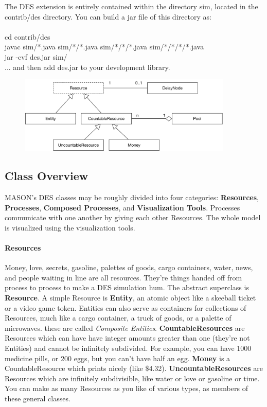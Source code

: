 \documentclass[twoside,10pt]{article}
\newcommand\file[1]{\textsf{#1}}
\newcommand\code[1]{\textsf{#1}}
\begin{document}
The DES extension is entirely contained within the directory \file{sim}, located in the \file{contrib/des} directory.  You can build a jar file of this directory as:
\\
\\
\code{cd contrib/des}\\
\code{javac sim/*.java sim/*/*.java sim/*/*/*.java sim/*/*/*/*.java}\\
\code{jar -cvf des.jar sim/}
\\

... and then add \code{des.jar} to your development library.

\begin{figure}[t]
\centering\includegraphics[width=4in]{Resources.pdf}
\end{figure}

\subsection{Class Overview}

MASON's DES classes may be roughly divided into four categories: {\bf Resources}, {\bf Processes}, {\bf Composed Processes}, and {\bf Visualization Tools}.  Processes communicate with one another by giving each other Resources.  The whole model is visualized using the visualization tools.

\paragraph{Resources}  Money, love, secrets, gasoline, palettes of goods, cargo containers, water, news, and people waiting in line are all resources.  They're things handed off from process to process to make a DES simulation hum.  The abstract superclass is {\bf Resource}.   A simple Resource is {\bf Entity}, an atomic object like a skeeball ticket or a video game token.  Entities can also serve as containers for collections of Resources, much like a cargo container, a truck of goods, or a palette of microwaves.  
these are called  {\it Composite Entities}.  {\bf CountableResources} are Resources which can have have integer amounts greater than one (they're not Entities) and cannot be infinitely subdivided.  For example, you can have 1000 medicine pills, or 200 eggs, but you can't have half an egg.  {\bf Money} is a CountableResource which prints nicely (like \$4.32).  {\bf UncountableResources} are Resources which are infinitely subdivisible, like water or love or gasoline or time.  You can make as many Resources as you like of various types, as members of these general classes.
\end{document}
